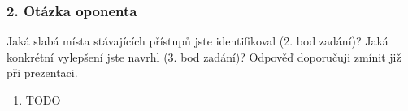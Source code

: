 \begin{frame}
    \frametitle{2. Otázka oponenta}
    \large{Jaká slabá místa stávajících přístupů jste identifikoval (2. bod zadání)? Jaká konkrétní vylepšení jste navrhl (3. bod zadání)? Odpověď doporučuji zmínit již při prezentaci.}

    \begin{enumerate}
        \item TODO
    \end{enumerate}
\end{frame}








